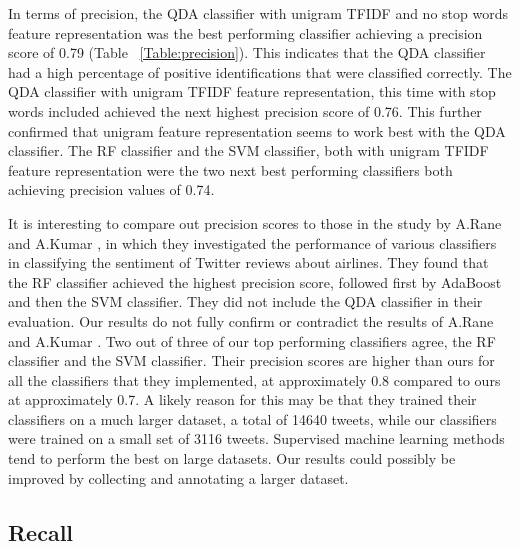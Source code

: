 In terms of precision, the QDA classifier with unigram TFIDF and no stop words feature representation was the best performing classifier achieving a precision score of 0.79 (Table ~\ref{Table:precision}). This indicates that the QDA classifier had a high percentage of positive identifications that were classified correctly. The QDA classifier with unigram TFIDF feature representation, this time with stop words included achieved the next highest precision score of 0.76. This further confirmed that unigram feature representation seems to work best with the QDA classifier. The RF classifier and the SVM classifier, both with unigram TFIDF feature representation were the two next best performing classifiers both achieving precision values of 0.74.

It is interesting to compare out precision scores to those in the study by A.Rane and A.Kumar \cite{Rane2018}, in which they investigated the performance of various classifiers in classifying the sentiment of Twitter reviews about airlines. They found that the RF classifier achieved the highest precision score, followed first by AdaBoost and then the SVM classifier. They did not include the QDA classifier in their evaluation. Our results do not fully confirm or contradict the results of A.Rane and A.Kumar \cite{Rane2018}. Two out of three of our top performing classifiers agree, the RF classifier and the SVM classifier. Their precision scores are higher than ours for all the classifiers that they implemented, at approximately 0.8 compared to ours at approximately 0.7. A likely reason for this may be that they trained their classifiers on a much larger dataset, a total of 14640 tweets, while our classifiers were trained on a small set of 3116 tweets. Supervised machine learning methods tend to perform the best on large datasets. Our results could possibly be improved by collecting and annotating a larger dataset.

\subsection*{Recall}

